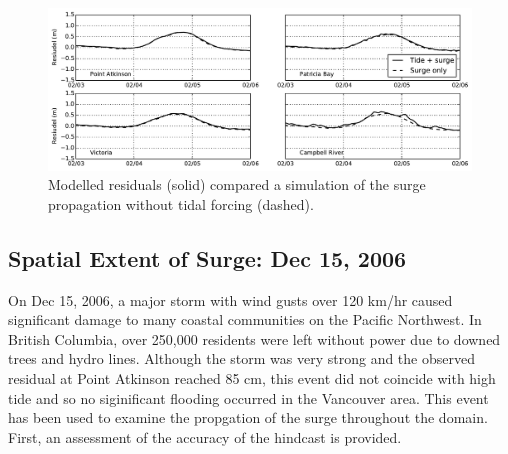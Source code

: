 \documentclass[pdftex,10pt]{article}
\begin{document}

\begin{figure}
\centering
\includegraphics[scale=0.6]{Figures/feb2006_tidesurge_bg.pdf}
\caption{Modelled residuals (solid) compared a simulation of the surge propagation without tidal forcing (dashed).}
\label{fig:tidesurge}
\end{figure}

\subsection{Spatial Extent of Surge: Dec 15, 2006}
On Dec 15, 2006, a major storm with wind gusts over 120 km/hr caused significant damage to many coastal communities on the Pacific Northwest. In British Columbia, over 250,000 residents were left without power due to downed trees and hydro lines. Although the storm was very strong and the observed residual at Point Atkinson reached 85 cm, this event did not coincide with high tide and so no siginificant flooding occurred in the Vancouver area\citep{forseth2006adaptation}. This event has been used to examine the propgation of the surge throughout the domain. First, an assessment of the accuracy of the hindcast is provided. 
\end{document}
